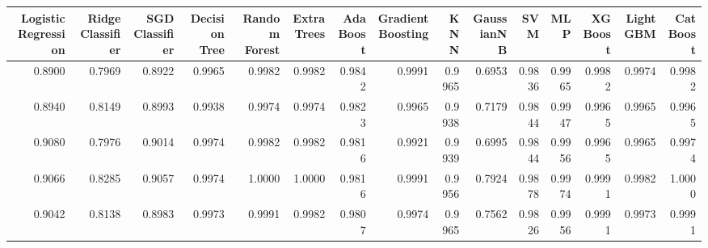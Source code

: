 \begin{tabular}{rrrrrrrrrrrrrrr}
\toprule
Logistic Regression & Ridge Classifier & SGD Classifier & Decision Tree & Random Forest & Extra Trees & AdaBoost & Gradient Boosting & KNN & GaussianNB & SVM & MLP & XGBoost & LightGBM & CatBoost \\
\midrule
0.8900 & 0.7969 & 0.8922 & 0.9965 & 0.9982 & 0.9982 & 0.9842 & 0.9991 & 0.9965 & 0.6953 & 0.9836 & 0.9965 & 0.9982 & 0.9974 & 0.9982 \\
0.8940 & 0.8149 & 0.8993 & 0.9938 & 0.9974 & 0.9974 & 0.9823 & 0.9965 & 0.9938 & 0.7179 & 0.9844 & 0.9947 & 0.9965 & 0.9965 & 0.9965 \\
0.9080 & 0.7976 & 0.9014 & 0.9974 & 0.9982 & 0.9982 & 0.9816 & 0.9921 & 0.9939 & 0.6995 & 0.9844 & 0.9956 & 0.9965 & 0.9965 & 0.9974 \\
0.9066 & 0.8285 & 0.9057 & 0.9974 & 1.0000 & 1.0000 & 0.9816 & 0.9991 & 0.9956 & 0.7924 & 0.9878 & 0.9974 & 0.9991 & 0.9982 & 1.0000 \\
0.9042 & 0.8138 & 0.8983 & 0.9973 & 0.9991 & 0.9982 & 0.9807 & 0.9974 & 0.9965 & 0.7562 & 0.9826 & 0.9956 & 0.9991 & 0.9973 & 0.9991 \\
\bottomrule
\end{tabular}
